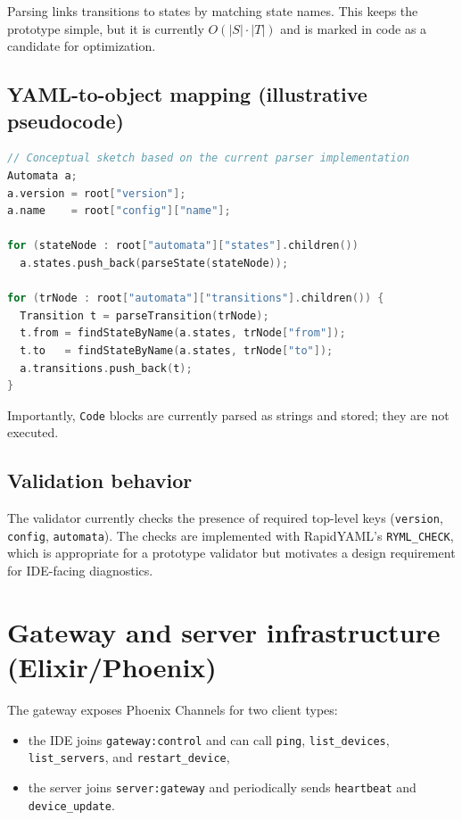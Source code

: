 Parsing links transitions to states by matching state names. This keeps the prototype simple, but it is currently $O(|S|\cdot|T|)$ and is marked in code as a candidate for optimization.

\subsection{YAML-to-object mapping (illustrative pseudocode)}
\begin{lstlisting}[language=C++,basicstyle=\ttfamily\small]
// Conceptual sketch based on the current parser implementation
Automata a;
a.version = root["version"];
a.name    = root["config"]["name"];

for (stateNode : root["automata"]["states"].children())
  a.states.push_back(parseState(stateNode));

for (trNode : root["automata"]["transitions"].children()) {
  Transition t = parseTransition(trNode);
  t.from = findStateByName(a.states, trNode["from"]);
  t.to   = findStateByName(a.states, trNode["to"]);
  a.transitions.push_back(t);
}
\end{lstlisting}

Importantly, \texttt{Code} blocks are currently parsed as strings and stored; they are not executed.

\subsection{Validation behavior}
The validator currently checks the presence of required top-level keys (\texttt{version}, \texttt{config}, \texttt{automata}).
The checks are implemented with RapidYAML's \texttt{RYML\_CHECK}, which is appropriate for a prototype validator but motivates a design requirement for IDE-facing diagnostics.

\section{Gateway and server infrastructure (Elixir/Phoenix)}

The gateway exposes Phoenix Channels for two client types:
\begin{itemize}
  \item the IDE joins \texttt{gateway:control} and can call \texttt{ping}, \texttt{list\_devices}, \texttt{list\_servers}, and \texttt{restart\_device},
  \item the server joins \texttt{server:gateway} and periodically sends \texttt{heartbeat} and \texttt{device\_update}.
\end{itemize}

